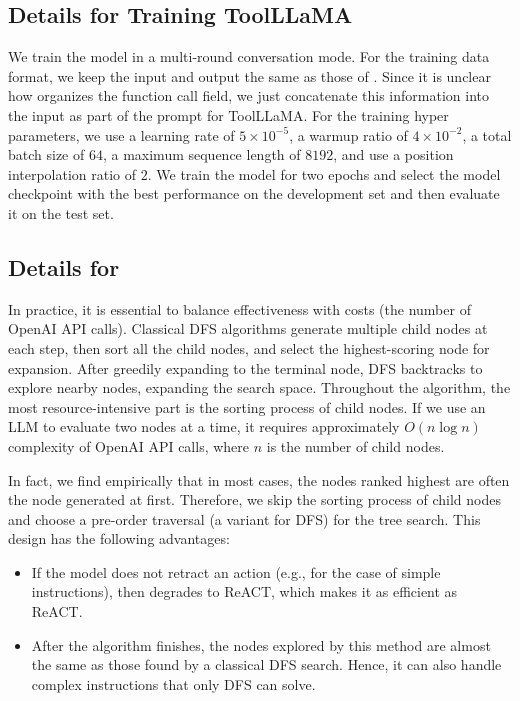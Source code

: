 \subsection{Details for Training ToolLLaMA}
\label{details_training_toolllama}
We train the model in a multi-round conversation mode. For the training data format, we keep the input and output the same as those of \turbo. Since it is unclear how \turbo organizes the function call field, we just concatenate this information into the input as part of the prompt for ToolLLaMA. For the training hyper parameters, we use a learning rate of $5\times10^{-5}$, a warmup ratio of $4\times10^{-2}$, a total batch size of $64$, a maximum sequence length of $8192$, and use a position interpolation ratio of $2$. We train the model for two epochs and select the model checkpoint
with the best performance on the development set
and then evaluate it on the test set.

\subsection{Details for \dfs}
\label{DFS_implementation}

In practice, it is essential to balance effectiveness with costs (the number of OpenAI API calls). Classical DFS algorithms generate multiple child nodes at each step, then sort all the child nodes, and select the highest-scoring node for expansion. After greedily expanding to the terminal node, DFS backtracks to explore nearby nodes, expanding the search space. Throughout the algorithm, the most resource-intensive part is the sorting process of child nodes. If we use an LLM to evaluate two nodes at a time, it requires approximately $O(n\log n)$ complexity of OpenAI API calls, where $n$ is the number of child nodes.

In fact, we find empirically that in most cases, the nodes ranked highest are often the node generated at first.
Therefore, we skip the sorting process of child nodes and choose a pre-order traversal (a variant for DFS) for the tree search. This design has the following advantages:

\begin{itemize}
    \item If the model does not retract an action (e.g., for the case of simple instructions), then \dfs degrades to ReACT, which makes it as efficient as ReACT.
    \item After the algorithm finishes, the nodes explored by this method are almost the same as those found by a classical DFS search. Hence, it can also handle complex instructions that only DFS can solve.
\end{itemize}

